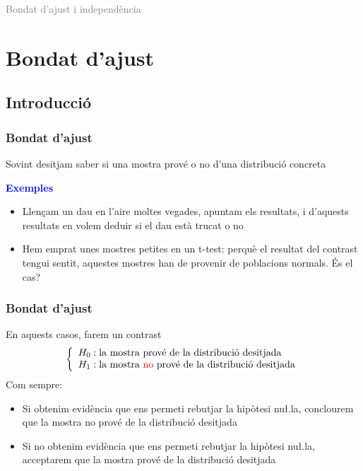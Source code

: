 \documentclass[12pt,t]{beamer}
\title[\red{Matemàtiques III}]{}
\author[]{}
\date{}
\newcommand{\blue}[1]{\textcolor{blue}{#1}}
\newcommand{\gray}[1]{\textcolor{gray}{#1}}
\renewcommand{\emph}[1]{{\color{red}#1}}
\theoremstyle{plain}
\theoremstyle{definition}
\begin{document}

\beamertemplatedotitem

\lstset{breaklines=true}
\lstset{basicstyle=\ttfamily}


\begin{frame}
\vfill
\begin{center}
\gray{\LARGE Bondat d'ajust i independència}
\end{center}
\vfill
\end{frame}




\section{Bondat d'ajust}
\subsection{Introducció}

\begin{frame}

\frametitle{Bondat d'ajust}

Sovint desitjam saber si una mostra prové o no d'una distribució concreta
\medskip

\blue{\textbf{Exemples}}
\begin{itemize}
\item Llençam un dau en l'aire moltes vegades, apuntam els resultats, i d'aquests resultats en volem deduir si el dau està trucat o no
\medskip


\item Hem emprat unes mostres petites en un t-test: perquè el resultat del contrast tengui sentit, aquestes mostres han de provenir de poblacions normals. És el cas?
\end{itemize}
\end{frame}


\begin{frame}

\frametitle{Bondat d'ajust}

En aquests casos, farem un contrast
$$
\left\{
\begin{array}{l}
H_0: \mbox{la mostra prové de la distribució desitjada}\\
H_1: \mbox{la mostra \emph{no} prové de la distribució desitjada}
\end{array}
\right.
$$
Com sempre:
\begin{itemize}
\item Si obtenim evidència que ens permeti rebutjar la hipòtesi nu\l.la, conclourem que la mostra no prové  
 de la distribució desitjada
 \medskip
 
\item Si no obtenim evidència que ens permeti rebutjar la hipòtesi nu\l.la, acceptarem que la mostra prové  
 de la distribució desitjada 
 \end{itemize}
\end{frame}
\end{document}
